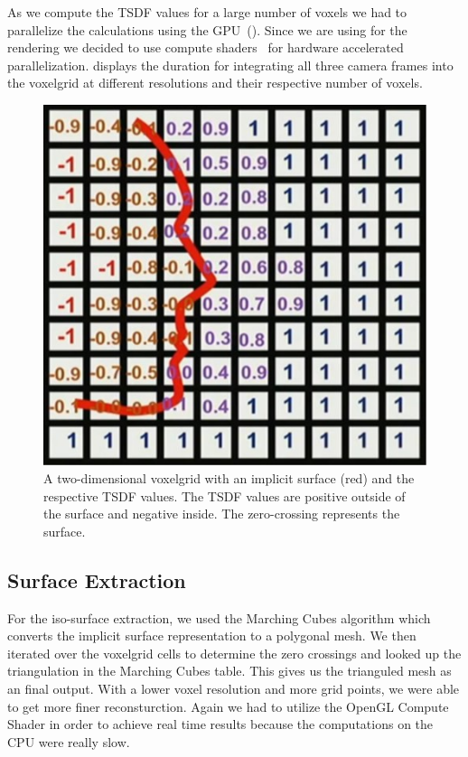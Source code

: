 \documentclass[10pt,twocolumn,letterpaper]{article}
\begin{document}
As we compute the TSDF values for a large number of voxels we had to parallelize the calculations using the GPU~(). Since we are using \opengl{} for the rendering we decided to use \opengl{} compute shaders~\cite{Authors1} for hardware accelerated parallelization.  displays the duration for integrating all three camera frames into the voxelgrid at different resolutions and their respective number of voxels. \\

\begin{figure}[t]
\begin{center}
\includegraphics[width=0.6\linewidth]{imgs/tsdf}
\end{center}
 \caption{A two-dimensional voxelgrid with an implicit surface (red) and the respective TSDF values. The TSDF values are positive outside of the surface and negative inside. The zero-crossing represents the surface.}
 \label{fig:voxelgrid}
\end{figure}

\subsection{Surface Extraction}
For the iso-surface extraction, we used the Marching Cubes algorithm which converts the implicit surface representation to a polygonal mesh. We then iterated over the voxelgrid cells to determine the zero crossings and looked up the triangulation in the Marching Cubes table. This gives us the trianguled mesh as an final output. With a lower voxel resolution and more grid points, we were able to get more finer reconsturction. Again we had to utilize the OpenGL Compute Shader in order to achieve real time results because the computations on the CPU were really slow.
\end{document}
